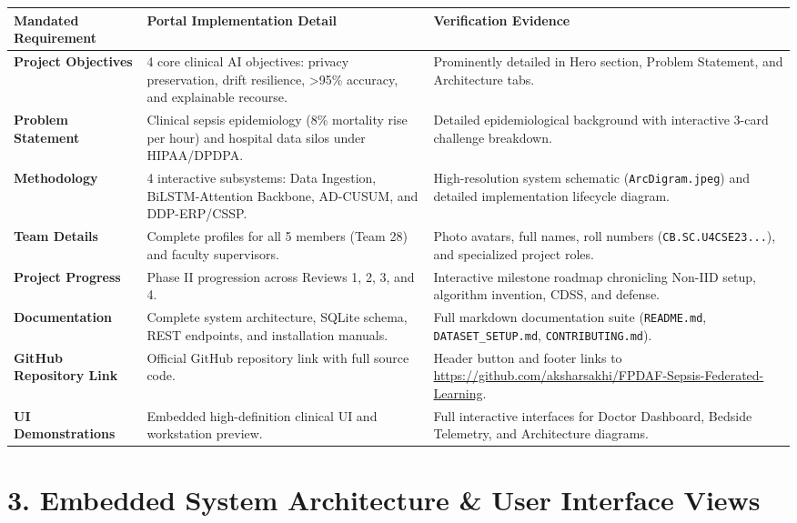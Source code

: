 \documentclass[11pt, a4paper]{article}
\begin{document}
\begin{center}
\small
\renewcommand{\arraystretch}{1.2}
\begin{tabular}{|l|p{6.0cm}|p{6.2cm}|}
\hline
\textbf{Mandated Requirement} & \textbf{Portal Implementation Detail} & \textbf{Verification Evidence} \\
\hline
\textbf{Project Objectives} & 4 core clinical AI objectives: privacy preservation, drift resilience, >95\% accuracy, and explainable recourse. & Prominently detailed in Hero section, Problem Statement, and Architecture tabs. \\
\hline
\textbf{Problem Statement} & Clinical sepsis epidemiology ($8\%$ mortality rise per hour) and hospital data silos under HIPAA/DPDPA. & Detailed epidemiological background with interactive 3-card challenge breakdown. \\
\hline
\textbf{Methodology} & 4 interactive subsystems: Data Ingestion, BiLSTM-Attention Backbone, AD-CUSUM, and DDP-ERP/CSSP. & High-resolution system schematic (\texttt{ArcDigram.jpeg}) and detailed implementation lifecycle diagram. \\
\hline
\textbf{Team Details} & Complete profiles for all 5 members (Team 28) and faculty supervisors. & Photo avatars, full names, roll numbers (\texttt{CB.SC.U4CSE23...}), and specialized project roles. \\
\hline
\textbf{Project Progress} & Phase II progression across Reviews 1, 2, 3, and 4. & Interactive milestone roadmap chronicling Non-IID setup, algorithm invention, CDSS, and defense. \\
\hline
\textbf{Documentation} & Complete system architecture, SQLite schema, REST endpoints, and installation manuals. & Full markdown documentation suite (\texttt{README.md}, \texttt{DATASET\_SETUP.md}, \texttt{CONTRIBUTING.md}). \\
\hline
\textbf{GitHub Repository Link} & Official GitHub repository link with full source code. & Header button and footer links to \url{https://github.com/aksharsakhi/FPDAF-Sepsis-Federated-Learning}. \\
\hline
\textbf{UI Demonstrations} & Embedded high-definition clinical UI and workstation preview. & Full interactive interfaces for Doctor Dashboard, Bedside Telemetry, and Architecture diagrams. \\
\hline
\end{tabular}
\end{center}

\clearpage

\section*{3. Embedded System Architecture \& User Interface Views}
\end{document}
